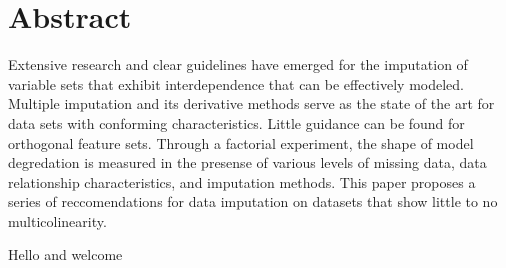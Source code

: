 \documentclass[../paper.tex]{subfiles}
\begin{document}
\section{Abstract}

Extensive research and clear guidelines have emerged for the imputation
of variable sets that exhibit interdependence that can be effectively modeled.
Multiple imputation and its derivative methods serve as the state of the art for
data sets with conforming characteristics. Little guidance can be found
for orthogonal feature sets. Through a factorial experiment, the shape of model
degredation is measured in the presense of various levels of missing data,
data relationship characteristics, and imputation methods.
This paper proposes a series of reccomendations for data imputation on datasets
that show little to no multicolinearity.


Hello and welcome
\end{document}

